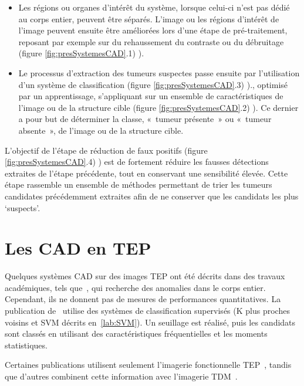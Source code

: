 \begin{itemize}
\item Les régions ou organes d’intérêt du système, lorsque celui-ci n’est pas dédié au corps entier, peuvent être séparés. L’image ou les régions d’intérêt de l’image peuvent ensuite être améliorées lors d’une étape de pré-traitement, reposant par exemple sur du rehaussement du contraste ou du débruitage (figure \ref{fig:presSystemesCAD}.1) ).
\item Le processus d’extraction des tumeurs suspectes passe ensuite par l’utilisation d’un système de classification (figure \ref{fig:presSystemesCAD}.3) )., optimisé par un apprentissage, s’appliquant sur un ensemble de caractéristiques de l’image ou de la structure cible (figure \ref{fig:presSystemesCAD}.2) ). Ce dernier a pour but de déterminer la classe, « tumeur présente » ou « tumeur absente », de l’image ou de la structure cible. 
\end{itemize}
L’objectif de l’étape de réduction de faux positifs (figure \ref{fig:presSystemesCAD}.4) ) est de fortement réduire les fausses détections extraites de l’étape précédente, tout en conservant une sensibilité élevée. Cette étape rassemble un ensemble de méthodes permettant de trier les tumeurs candidates précédemment extraites afin de ne conserver que les candidats les plus ‘suspects’.  

	\section{Les CAD en TEP}
\label{lab:CADTEP}

Quelques systèmes CAD sur des images TEP ont été décrits dans des travaux académiques, tels que~\cite{guan2006automatic}, qui recherche des anomalies dans le corps entier. Cependant, ils ne donnent pas de mesures de performances quantitatives. La publication de~\cite{kanakatte2008pulmonary} utilise des systèmes de classification supervisés (K plus proches voisins et SVM décrits en~\ref{lab:SVM}). Un seuillage est réalisé, puis les candidats sont classés en utilisant des caractéristiques fréquentielles et les moments statistiques. 

Certaines publications utilisent seulement l'imagerie fonctionnelle TEP~\cite{ying2004novel, kanakatte2007pilot, kanakatte2008pulmonary, saradhi2009framework, el2009exploring, mhd2010artificial}, tandis que d'autres combinent cette information avec l'imagerie TDM~\cite{jafar2006computerized, nie2006integrating, potesil2007automated}.

